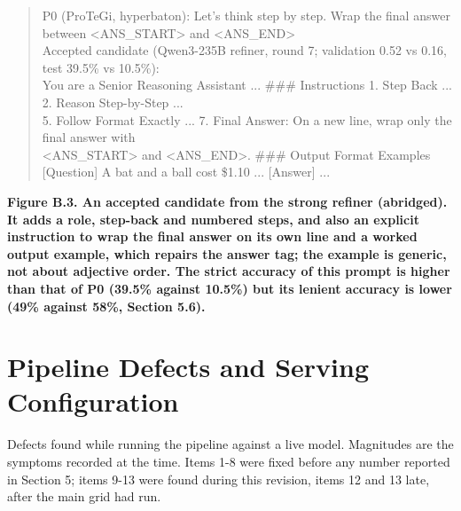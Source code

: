 \documentclass{ieeeaccess}
\begin{document}
\centering
\begin{quote}\ttfamily\small
P0 (ProTeGi, hyperbaton):  Let's think step by step.  Wrap the final answer between <ANS\_\allowbreak{}START> and <ANS\_\allowbreak{}END>\\{}
Accepted candidate (Qwen3-235B refiner, round 7; validation 0.52 vs 0.16, test 39.5\% vs 10.5\%):\\{}
  You are a Senior Reasoning Assistant ... \#\#\# Instructions  1. Step Back ... 2. Reason Step-by-Step ...\\{}
  5. Follow Format Exactly ...  7. Final Answer: On a new line, wrap only the final answer with\\{}
  <ANS\_\allowbreak{}START> and <ANS\_\allowbreak{}END>.   \#\#\# Output Format Examples  [Question] A bat and a ball cost \$1.10 ... [Answer] ...\\{}
\end{quote}
\par\noindent\textbf{Figure B.3. An accepted candidate from the strong refiner (abridged). It adds a role, step-back and numbered steps, and also an explicit instruction to wrap the final answer on its own line and a worked output example, which repairs the answer tag; the example is generic, not about adjective order. The strict accuracy of this prompt is higher than that of P0 (39.5\% against 10.5\%) but its lenient accuracy is lower (49\% against 58\%, Section 5.6).}

\section{Pipeline Defects and Serving Configuration}

Defects found while running the pipeline against a live model. Magnitudes are the symptoms recorded at the time. Items 1-8 were fixed before any number reported in Section 5; items 9-13 were found during this revision, items 12 and 13 late, after the main grid had run.
\end{document}
